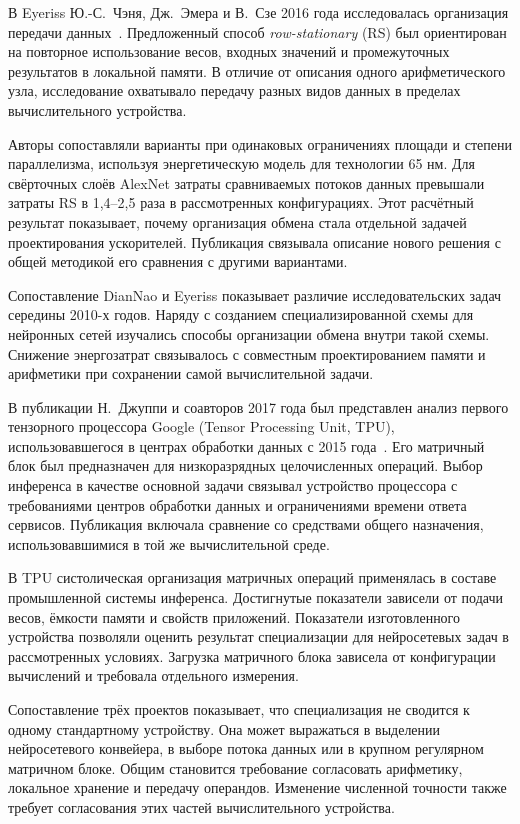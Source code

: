 В Eyeriss Ю.-С.~Чэня, Дж.~Эмера и В.~Сзе 2016 года
исследовалась организация передачи данных~\cite{eyeriss2016}.
Предложенный способ \textit{row-stationary} (RS) был ориентирован
на повторное использование весов, входных значений
и промежуточных результатов в локальной памяти.
В отличие от описания одного арифметического узла,
исследование охватывало передачу разных видов данных
в пределах вычислительного устройства.

Авторы сопоставляли варианты при одинаковых ограничениях
площади и степени параллелизма, используя энергетическую
модель для технологии 65 нм. Для свёрточных слоёв AlexNet
затраты сравниваемых потоков данных превышали затраты RS
в 1,4--2,5 раза в рассмотренных конфигурациях.
Этот расчётный результат показывает, почему организация
обмена стала отдельной задачей проектирования ускорителей.
Публикация связывала описание нового решения
с общей методикой его сравнения с другими вариантами.

Сопоставление DianNao и Eyeriss показывает различие
исследовательских задач середины 2010-х годов.
Наряду с созданием специализированной схемы для нейронных
сетей изучались способы организации обмена внутри такой
схемы. Снижение энергозатрат связывалось с совместным
проектированием памяти и арифметики при сохранении
самой вычислительной задачи.

В публикации Н.~Джуппи и соавторов 2017 года был представлен анализ
первого тензорного процессора Google (Tensor Processing Unit, TPU),
использовавшегося в центрах
обработки данных с 2015 года~\cite{jouppi2017}. Его матричный блок
был предназначен для низкоразрядных целочисленных операций.
Выбор инференса в качестве основной задачи связывал
устройство процессора с требованиями центров обработки
данных и ограничениями времени ответа сервисов.
Публикация включала сравнение со средствами общего назначения,
использовавшимися в той же вычислительной среде.

В TPU систолическая организация матричных операций применялась
в составе промышленной системы инференса. Достигнутые показатели
зависели от подачи весов, ёмкости памяти и свойств приложений.
Показатели изготовленного устройства позволяли оценить результат специализации
для нейросетевых задач в рассмотренных условиях. Загрузка матричного блока
зависела от конфигурации вычислений и требовала отдельного измерения.

Сопоставление трёх проектов показывает, что специализация не сводится
к одному стандартному устройству. Она может выражаться в выделении
нейросетевого конвейера, в выборе потока данных или в крупном регулярном
матричном блоке. Общим становится требование согласовать арифметику,
локальное хранение и передачу операндов. Изменение численной точности также требует согласования этих частей
вычислительного устройства.

